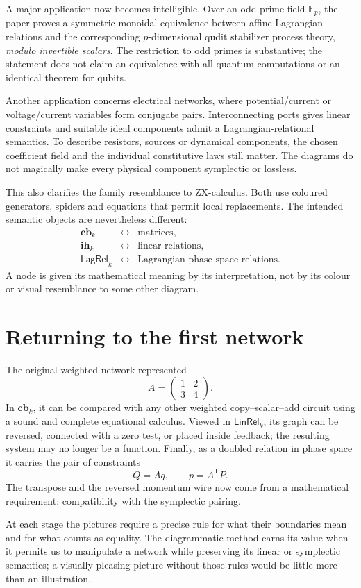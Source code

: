A major application now becomes intelligible. Over an odd prime field \(\mathbb F_p\), the paper proves a symmetric monoidal equivalence between affine Lagrangian relations and the corresponding \(p\)-dimensional qudit stabilizer process theory, \emph{modulo invertible scalars}. The restriction to odd primes is substantive; the statement does not claim an equivalence with all quantum computations or an identical theorem for qubits.

Another application concerns electrical networks, where potential/current or voltage/current variables form conjugate pairs. Interconnecting ports gives linear constraints and suitable ideal components admit a Lagrangian-relational semantics. To describe resistors, sources or dynamical components, the chosen coefficient field and the individual constitutive laws still matter. The diagrams do not magically make every physical component symplectic or lossless.

This also clarifies the family resemblance to ZX-calculus. Both use coloured generators, spiders and equations that permit local replacements. The intended semantic objects are nevertheless different:
\[
 \begin{array}{rcl}
 \mathbf{cb}_k&\longleftrightarrow&\text{matrices},\\
 \mathbf{ih}_k&\longleftrightarrow&\text{linear relations},\\
 \mathsf{LagRel}_k&\longleftrightarrow&\text{Lagrangian phase-space relations}.
 \end{array}
\]
A node is given its mathematical meaning by its interpretation, not by its colour or visual resemblance to some other diagram.

\section{Returning to the first network}

The original weighted network represented
\[
 A=\begin{pmatrix}1&2\\3&4\end{pmatrix}.
\]
In \(\mathbf{cb}_k\), it can be compared with any other weighted copy--scalar--add circuit using a sound and complete equational calculus. Viewed in \(\mathsf{LinRel}_k\), its graph can be reversed, connected with a zero test, or placed inside feedback; the resulting system may no longer be a function. Finally, as a doubled relation in phase space it carries the pair of constraints
\[
 Q=Aq,\qquad p=A^{\mathsf T}P.
\]
The transpose and the reversed momentum wire now come from a mathematical requirement: compatibility with the symplectic pairing.

At each stage the pictures require a precise rule for what their boundaries mean and for what counts as equality. The diagrammatic method earns its value when it permits us to manipulate a network while preserving its linear or symplectic semantics; a visually pleasing picture without those rules would be little more than an illustration.
